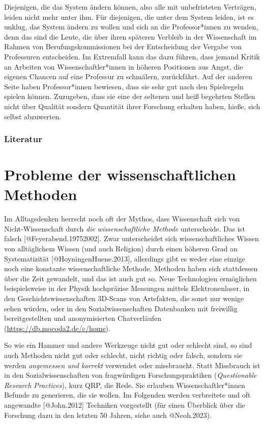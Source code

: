 \documentclass[
  letterpaper,
  DIV=11,
  numbers=noendperiod]{scrreprt}
\begin{document}
Diejenigen, die das System ändern können, also alle mit unbefristeten
Verträgen, leiden nicht mehr unter ihm. Für diejenigen, die unter dem
System leiden, ist es unklug, das System ändern zu wollen und sich an
die Professor*innen zu wenden, denn das sind die Leute, die über ihren
späteren Verbleib in der Wissenschaft im Rahmen von
Berufungskommissionen bei der Entscheidung der Vergabe von Professuren
entscheiden. Im Extremfall kann das dazu führen, dass jemand Kritik an
Arbeiten von Wissenschaftler*innen in höheren Positionen aus Angst, die
eigenen Chancen auf eine Professur zu schmälern, zurückfährt. Auf der
anderen Seite haben Professor*innen bewiesen, dass sie sehr gut nach den
Spielregeln spielen können. Zuzugeben, dass sie eine der seltenen und
heiß begehrten Stellen nicht über Qualität sondern Quantität ihrer
Forschung erhalten haben, hieße, sich selbst abzuwerten.

\subsection{Literatur}\label{literatur-7}

\chapter{Probleme der wissenschaftlichen
Methoden}\label{probleme-der-wissenschaftlichen-methoden}

Im Alltagsdenken herrscht noch oft der Mythos, dass Wissenschaft sich
von Nicht-Wissenschaft durch \emph{die wissenschaftliche Methode}
unterscheide. Das ist falsch {[}@Feyerabend.19752002{]}. Zwar
unterscheidet sich wissenschaftliches Wissen von alltäglichem Wissen
(und auch Religion) durch einen höheren Grad an Systematizität
{[}@HoyningenHuene.2013{]}, allerdings gibt es weder eine einzige noch
eine konstante wissenschaftliche Methode. Methoden haben sich
stattdessen über die Zeit gewandelt, und das ist auch gut so. Neue
Technologien ermöglichen beispielsweise in der Physik hochpräzise
Messungen mittels Elektronenlaser, in den Geschichtswissenschaften
3D-Scans von Artefakten, die sonst nur wenige sehen würden, oder in den
Sozialwissenschaften Datenbanken mit freiwillig bereitgestellten und
anonymisierten Chatverläufen (\url{https://db.mocoda2.de/c/home}).

So wie ein Hammer und andere Werkzeuge nicht gut oder schlecht sind, so
sind auch Methoden nicht gut oder schlecht, nicht richtig oder falsch,
sondern sie werden \emph{angemessen und korrekt} verwendet oder
missbraucht. Statt Missbrauch ist in den Sozialwissenschaften von
fragwürdigen Forschungspraktiken (\emph{Questionable Research
Practices}), kurz QRP, die Rede. Sie erlauben Wissenschaftler*innen
Befunde zu generieren, die sie wollen. Im Folgenden werden verbreitete
und oft angewandte {[}@John.2012{]} Techniken vorgestellt (für einen
Überblick über die Forschung dazu in den letzten 50 Jahren, siehe auch
@Neoh.2023).
\end{document}
